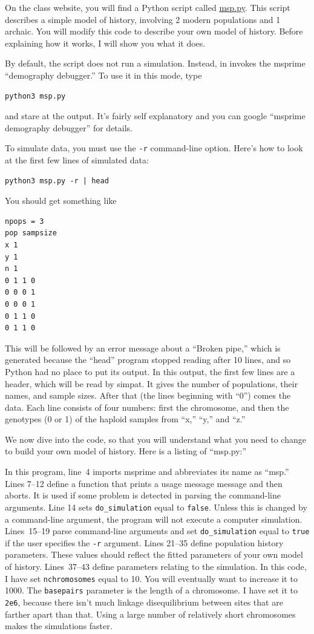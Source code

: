 \documentclass[11pt]{article}
\begin{document}
On the class website, you will find a Python script called
\href{./msp.py}{msp.py}. This script describes a simple model of
history, involving 2 modern populations and 1 archaic. You will modify
this code to describe your own model of history. Before explaining how
it works, I will show you what it does.

By default, the script does not run a simulation. Instead, in invokes
the msprime ``demography debugger.'' To use it in this mode, type
\begin{verbatim}
python3 msp.py
\end{verbatim}
and stare at the output. It's fairly self explanatory and you can
google ``msprime demography debugger'' for details.

To simulate data, you must use the \texttt{-r} command-line
option. Here's how to look at the first few lines of simulated data:
\begin{verbatim}
python3 msp.py -r | head
\end{verbatim}
You should get something like
\begin{verbatim}
npops = 3
pop sampsize
x 1
y 1
n 1
0 1 1 0 
0 0 0 1 
0 0 0 1 
0 1 1 0 
0 1 1 0 
\end{verbatim}
This will be followed by an error message about a ``Broken pipe,''
which is generated because the ``head'' program stopped reading after
10 lines, and so Python had no place to put its output. In this
output, the first few lines are a header, which will be read by
simpat. It gives the number of populations, their names, and sample
sizes. After that (the lines beginning with ``0'') comes the
data. Each line consists of four numbers: first the chromosome, and
then the genotypes (0 or 1) of the haploid samples from ``x,'' ``y,''
and ``z.''

We now dive into the code, so that you will understand what you need
to change to build your own model of history. Here is a listing of
``msp.py:''


In this program, line~4 imports msprime and abbreviates its name as
``msp.'' Lines 7--12 define a function that prints a usage message
message and then aborts. It is used if some problem is detected in
parsing the command-line arguments. Line 14 sets \verb|do_simulation|
equal to \texttt{false}. Unless this is changed by a command-line
argument, the program will not execute a computer
simulation. Lines~15--19 parse command-line arguments and set
\verb|do_simulation| equal to \texttt{true} if the user specifies the
\texttt{-r} argument.  Lines 21--35 define population history
parameters. These values should reflect the fitted parameters of your
own model of history. Lines~37--43 define parameters relating to the
simulation. In this code, I have set \texttt{nchromosomes} equal to
10. You will eventually want to increase it to 1000. The
\texttt{basepairs} parameter is the length of a chromosome. I have set
it to \texttt{2e6}, because there isn't much linkage disequilibrium
between sites that are farther apart than that. Using a large number
of relatively short chromosomes makes the simulations faster.
\end{document}
